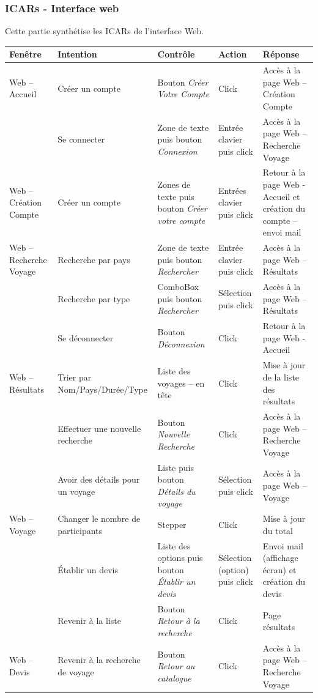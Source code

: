 \documentclass[11pt]{article}
\begin{document}
\subsubsection{ICARs - Interface web}
Cette partie synthétise les ICARs de l'interface Web.
\begin{center}
\begin{footnotesize}
\begin{supertabular}{|p{2cm}|p{3cm}|p{3.5cm}|p{2cm}|p{4cm}|}
\hline 
\bf{Fenêtre} & \bf{Intention} & \bf{Contrôle} & \bf{Action} & \bf{Réponse} \\ \hline
Web – Accueil & Créer un compte & Bouton  \emph{Créer Votre Compte} & Click & Accès à la page Web – Création Compte \\ \hline
 & Se connecter & Zone de texte puis bouton  \emph{Connexion} & Entrée clavier puis click & Accès à la page Web – Recherche Voyage \\ \hline
Web – Création Compte & Créer un compte & Zones de texte puis bouton  \emph{Créer votre compte} & Entrées clavier puis click & Retour à la page Web -Accueil et création du compte – envoi mail \\ \hline
Web – Recherche Voyage & Recherche par pays & Zone de texte puis bouton  \emph{Rechercher} & Entrée clavier puis click & Accès à la page Web – Résultats \\ \hline
 & Recherche par type & ComboBox puis bouton  \emph{Rechercher} & Sélection puis click & Accès à la page Web – Résultats \\ \hline
 & Se déconnecter & Bouton  \emph{Déconnexion} & Click & Retour à la page Web -Accueil \\ \hline
Web – Résultats & Trier par Nom/Pays/Durée/Type & Liste des voyages – en tête & Click & Mise à jour de la liste des résultats \\ \hline
 & Effectuer une nouvelle recherche & Bouton  \emph{Nouvelle Recherche} & Click & Accès à la page Web – Recherche Voyage \\ \hline
 & Avoir des détails pour un voyage & Liste puis bouton \emph{Détails du voyage} & Sélection puis click & Accès à la page Web – Voyage \\ \hline
Web – Voyage & Changer le nombre de participants & Stepper & Click & Mise à jour du total \\ \hline
 & Établir un devis & Liste des options puis bouton  \emph{Établir un devis} & Sélection (option) puis click & Envoi mail (affichage écran) et création du devis \\ \hline
 & Revenir à la liste & Bouton  \emph{Retour à la recherche} & Click & Page résultats \\ \hline
Web – Devis &Revenir à la recherche de voyage & Bouton \emph{Retour au catalogue} & Click & Accès à la page Web – Recherche Voyage \\ \hline
\end{supertabular}
\end{footnotesize}
\end{center}
\end{document}
